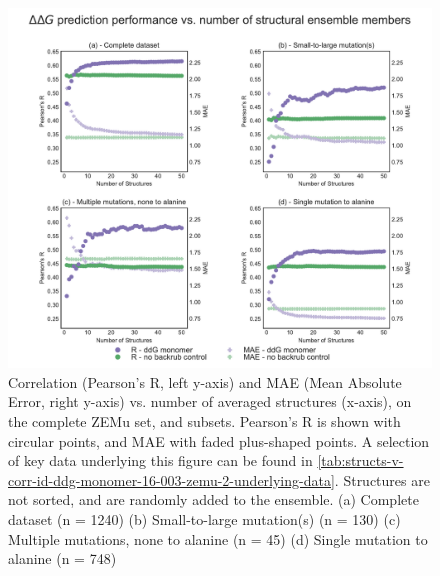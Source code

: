 \begin{figure}
  \includegraphics[width=\textwidth,keepaspectratio]{structs-v-corr-id-ddg-monomer-16-003-zemu-2.pdf}
  \caption[]{ %
    Correlation (Pearson's R, left y-axis) and MAE (Mean Absolute Error, right y-axis) vs. number of averaged structures (x-axis), on the complete ZEMu set, and subsets.
    Pearson's R is shown with circular points, and MAE with faded plus-shaped points.
    A selection of key data underlying this figure can be found in \cref{tab:structs-v-corr-id-ddg-monomer-16-003-zemu-2-underlying-data}.
    Structures are not sorted, and are randomly added to the ensemble. 
    (a) Complete dataset (n = 1240)
    (b) Small-to-large mutation(s) (n = 130)
    (c) Multiple mutations, none to alanine (n = 45)
    (d) Single mutation to alanine (n = 748)
  } \label{fig:structs-v-corr-id-ddg-monomer-16-003-zemu-2}
\end{figure}
